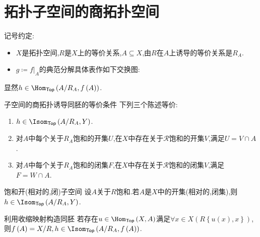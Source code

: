 \section{拓扑子空间的商拓扑空间}

记号约定:
\begin{itemize}
	\item $X$是拓扑空间,$R$是$X$上的等价关系,$A\subseteq X$,由$R$在$A$上诱导的等价关系是$R_{A}$.
	\item $g\coloneq f|_{A}$的典范分解具体表作如下交换图:
	\begin{center}
	\end{center}
\end{itemize}

显然$h\in\Hom_{\mathsf{Top}}\left(A/R_{A},f\left(A\right)\right)$.


\begin{proposition}{子空间的商拓扑诱导同胚的等价条件}{}
	下列三个陈述等价:
	\begin{enumerate}
		\item $h\in\Isom_{\mathsf{Top}}\left(A/R_{A},Y\right)$.
		\item 对$A$中每个关于$R_{A}$饱和的开集$U$,在$X$中存在关于$\mathcal{R}$饱和的开集$V$,满足$U=V\cap A$.
		\item 对$A$中每个关于$R_{A}$饱和的闭集$F$,在$X$中存在关于$\mathcal{R}$饱和的闭集$V$,满足$F=W\cap A$.
	\end{enumerate}
\end{proposition}

\begin{corollary}{饱和开(相对的,闭)子空间}{}
	设$A$关于$R$饱和.若$A$是$X$中的开集(相对的,闭集),则$h\in\Isom_{\mathsf{Top}}\left(A/R_{A},Y\right)$.
\end{corollary}

\begin{corollary}{利用收缩映射构造同胚}{}
	若存在$u\in\Hom_{\mathsf{Top}}\left(X,A\right)$满足$\forall x\in X\left(R\left\{u\left(x\right),x\right\}\right)$,则$f\left(A\right)=X/R,h\in\Isom_{\mathsf{Top}}\left(A/R_{A},f\left(A\right)\right)$.
\end{corollary}